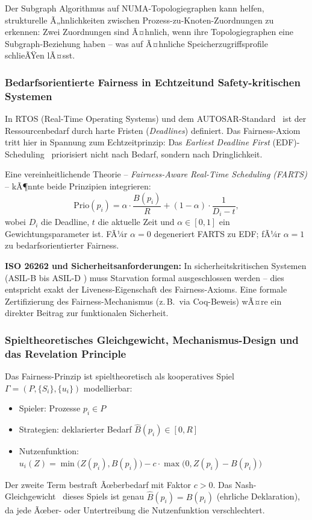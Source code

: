 ﻿\documentclass[a4paper,12pt]{article}
\theoremstyle{definition}
\begin{document}
Der Subgraph Algorithmus auf NUMA-Topologiegraphen kann
helfen, strukturelle Ã„hnlichkeiten zwischen
Prozess-zu-Knoten-Zuordnungen zu erkennen: Zwei
Zuordnungen sind Ã¤hnlich, wenn ihre Topologiegraphen eine
Subgraph-Beziehung haben -- was auf Ã¤hnliche
Speicherzugriffsprofile schlieÃŸen lÃ¤sst.

\subsubsection{Bedarfsorientierte Fairness in Echtzeitund Safety-kritischen Systemen}

In RTOS (Real-Time Operating Systems) und dem
AUTOSAR-Standard~\cite{autosar2021} ist der Ressourcenbedarf
durch harte Fristen (\emph{Deadlines}) definiert.
Das Fairness-Axiom tritt hier in Spannung zum
Echtzeitprinzip: Das \emph{Earliest Deadline First}
(EDF)-Scheduling~\cite{liu1973scheduling} priorisiert nicht
nach Bedarf, sondern nach Dringlichkeit.

Eine vereinheitlichende Theorie -- \emph{Fairness-Aware
Real-Time Scheduling (FARTS)} -- kÃ¶nnte beide Prinzipien
integrieren:
\[
  \mathrm{Prio}(p_i) = \alpha \cdot \frac{B(p_i)}{R}
                      + (1-\alpha) \cdot \frac{1}{D_i - t},
\]
wobei $D_i$ die Deadline, $t$ die aktuelle Zeit und
$\alpha \in [0,1]$ ein Gewichtungsparameter ist.
FÃ¼r $\alpha = 0$ degeneriert FARTS zu EDF;
fÃ¼r $\alpha = 1$ zu bedarfsorientierter Fairness.

\textbf{ISO 26262 und Sicherheitsanforderungen:}
In sicherheitskritischen Systemen (ASIL-B bis ASIL-D
\cite{iso26262}) muss Starvation formal ausgeschlossen
werden -- dies entspricht exakt der Liveness-Eigenschaft
des Fairness-Axioms. Eine formale Zertifizierung des
Fairness-Mechanismus (z.\,B.\ via Coq-Beweis) wÃ¤re
ein direkter Beitrag zur funktionalen Sicherheit.

\subsubsection{Spieltheoretisches Gleichgewicht, Mechanismus-Design
und das Revelation Principle}

Das Fairness-Prinzip ist spieltheoretisch als kooperatives
Spiel $\Gamma = (P, \{S_i\}, \{u_i\})$ modellierbar:
\begin{itemize}
  \item Spieler: Prozesse $p_i \in P$
  \item Strategien: deklarierter Bedarf $\hat{B}(p_i)
        \in [0, R]$
  \item Nutzenfunktion:
        $u_i(Z) = \min\!\bigl(Z(p_i), B(p_i)\bigr) -
        c \cdot \max\!\bigl(0, Z(p_i) - B(p_i)\bigr)$
\end{itemize}
Der zweite Term bestraft Ãœberbedarf mit Faktor $c > 0$.
Das Nash-Gleichgewicht~\cite{nash1950equilibrium} dieses Spiels
ist genau $\hat{B}(p_i) = B(p_i)$ (ehrliche Deklaration),
da jede Ãœber- oder Untertreibung die Nutzenfunktion
verschlechtert.
\end{document}
